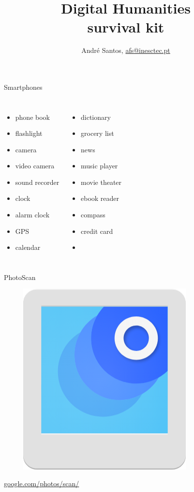 \documentclass[serif,14pt,color=usenames,dvipsnames]{beamer}
\title{{\Large Digital Humanities}\\survival kit}
\author{André Santos, \href{mailto:afs@inesctec.pt}{afs@inesctec.pt}}
\begin{document}
\begin{frame}
\maketitle
\end{frame}






\begin{frame}{Smartphones}
  \begin{columns}
    \begin{itemize}
      \item phone book
      \item flashlight
      \item camera
      \item video camera
      \item sound recorder
      \item clock
      \item alarm clock
      \item GPS
      \item calendar
    \end{itemize}
    \begin{itemize}
      \item dictionary
      \item grocery list
      \item news
      \item music player
      \item movie theater
      \item ebook reader
      \item compass
      \item credit card
      \item 
    \end{itemize}
  \end{columns}
\end{frame}

\begin{frame}{PhotoScan}
  \centering

  \begin{figure}
  \includegraphics[width=0.3\linewidth]{imgs/photoscan2}
  \end{figure}
  \vspace{0.5cm}
  \href{https://google.com/photos/scan/}{google.com/photos/scan/}
\end{frame}
\end{document}
